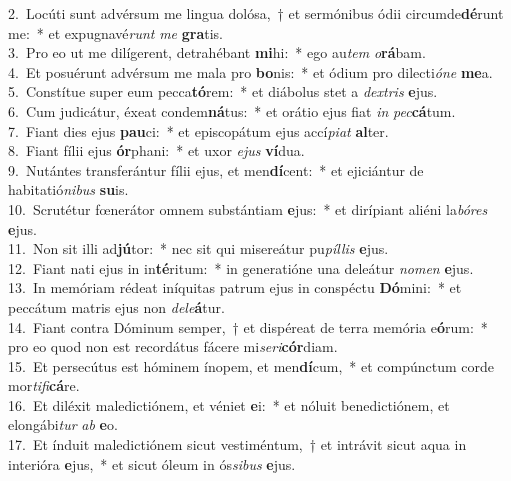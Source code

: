 {2.~}Locúti sunt advérsum me lingua dolósa,~† et sermónibus ódii circumde\textbf{dé}runt me:~* et expugnavé\textit{runt} \textit{me} \textbf{gra}tis.\\
{3.~}Pro eo ut me dilígerent, detrahébant \textbf{mi}hi:~* ego au\textit{tem} \textit{o}\textbf{rá}bam.\\
{4.~}Et posuérunt advérsum me mala pro \textbf{bo}nis:~* et ódium pro dilecti\textit{ó}\textit{ne} \textbf{me}a.\\
{5.~}Constítue super eum pecca\textbf{tó}rem:~* et diábolus stet a \textit{dex}\textit{tris} \textbf{e}jus.\\
{6.~}Cum judicátur, éxeat condem\textbf{ná}tus:~* et orátio ejus fiat \textit{in} \textit{pec}\textbf{cá}tum.\\
{7.~}Fiant dies ejus \textbf{pau}ci:~* et episcopátum ejus accí\textit{pi}\textit{at} \textbf{al}ter.\\
{8.~}Fiant fílii ejus \textbf{ór}phani:~* et uxor \textit{e}\textit{jus} \textbf{ví}dua.\\
{9.~}Nutántes transferántur fílii ejus, et men\textbf{dí}cent:~* et ejiciántur de habitatió\textit{ni}\textit{bus} \textbf{su}is.\\
{10.~}Scrutétur fœnerátor omnem substántiam \textbf{e}jus:~* et dirípiant aliéni la\textit{bó}\textit{res} \textbf{e}jus.\\
{11.~}Non sit illi ad\textbf{jú}tor:~* nec sit qui misereátur pu\textit{píl}\textit{lis} \textbf{e}jus.\\
{12.~}Fiant nati ejus in in\textbf{té}ritum:~* in generatióne una deleátur \textit{no}\textit{men} \textbf{e}jus.\\
{13.~}In memóriam rédeat iníquitas patrum ejus in conspéctu \textbf{Dó}mini:~* et peccátum matris ejus non \textit{de}\textit{le}\textbf{á}tur.\\
{14.~}Fiant contra Dóminum semper,~† et dispéreat de terra memória e\textbf{ó}rum:~* pro eo quod non est recordátus fácere mi\textit{se}\textit{ri}\textbf{cór}diam.\\
{15.~}Et persecútus est hóminem ínopem, et men\textbf{dí}cum,~* et compúnctum corde mor\textit{ti}\textit{fi}\textbf{cá}re.\\
{16.~}Et diléxit maledictiónem, et véniet \textbf{e}i:~* et nóluit benedictiónem, et elongábi\textit{tur} \textit{ab} \textbf{e}o.\\
{17.~}Et índuit maledictiónem sicut vestiméntum,~† et intrávit sicut aqua in interióra \textbf{e}jus,~* et sicut óleum in ós\textit{si}\textit{bus} \textbf{e}jus.\\
